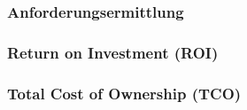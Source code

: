 \subsubsection{Anforderungsermittlung}
\subsubsection{Return on Investment (ROI)}
\subsubsection{Total Cost of Ownership (TCO)}

